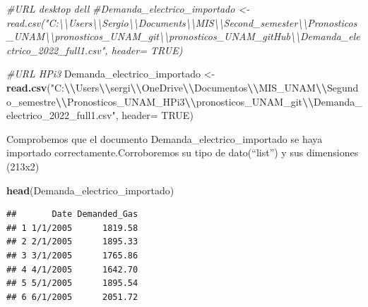 \documentclass[
]{article}
\newenvironment{Shaded}{\begin{snugshade}}{\end{snugshade}}
\newcommand{\AttributeTok}[1]{\textcolor[rgb]{0.13,0.29,0.53}{#1}}
\newcommand{\CommentTok}[1]{\textcolor[rgb]{0.56,0.35,0.01}{\textit{#1}}}
\newcommand{\ConstantTok}[1]{\textcolor[rgb]{0.56,0.35,0.01}{#1}}
\newcommand{\FunctionTok}[1]{\textcolor[rgb]{0.13,0.29,0.53}{\textbf{#1}}}
\newcommand{\NormalTok}[1]{#1}
\newcommand{\OtherTok}[1]{\textcolor[rgb]{0.56,0.35,0.01}{#1}}
\newcommand{\SpecialCharTok}[1]{\textcolor[rgb]{0.81,0.36,0.00}{\textbf{#1}}}
\newcommand{\StringTok}[1]{\textcolor[rgb]{0.31,0.60,0.02}{#1}}
\begin{document}
\begin{Shaded}
\begin{Highlighting}[]
\CommentTok{\#URL desktop dell}
\CommentTok{\#Demanda\_electrico\_importado \textless{}{-}read.csv("C:\textbackslash{}\textbackslash{}Users\textbackslash{}\textbackslash{}Sergio\textbackslash{}\textbackslash{}Documents\textbackslash{}\textbackslash{}MIS\textbackslash{}\textbackslash{}Second\_semester\textbackslash{}\textbackslash{}Pronosticos\_UNAM\textbackslash{}\textbackslash{}pronosticos\_UNAM\_git\textbackslash{}\textbackslash{}pronosticos\_UNAM\_gitHub\textbackslash{}\textbackslash{}Demanda\_electrico\_2022\_full1.csv", header= TRUE)}

\CommentTok{\#URL HPi3}
\NormalTok{Demanda\_electrico\_importado }\OtherTok{\textless{}{-}}\FunctionTok{read.csv}\NormalTok{(}\StringTok{"C:}\SpecialCharTok{\textbackslash{}\textbackslash{}}\StringTok{Users}\SpecialCharTok{\textbackslash{}\textbackslash{}}\StringTok{sergi}\SpecialCharTok{\textbackslash{}\textbackslash{}}\StringTok{OneDrive}\SpecialCharTok{\textbackslash{}\textbackslash{}}\StringTok{Documentos}\SpecialCharTok{\textbackslash{}\textbackslash{}}\StringTok{MIS\_UNAM}\SpecialCharTok{\textbackslash{}\textbackslash{}}\StringTok{Segundo\_semestre}\SpecialCharTok{\textbackslash{}\textbackslash{}}\StringTok{Pronosticos\_UNAM\_HPi3}\SpecialCharTok{\textbackslash{}\textbackslash{}}\StringTok{pronosticos\_UNAM\_git}\SpecialCharTok{\textbackslash{}\textbackslash{}}\StringTok{Demanda\_electrico\_2022\_full1.csv"}\NormalTok{, }\AttributeTok{header=} \ConstantTok{TRUE}\NormalTok{)}
\end{Highlighting}
\end{Shaded}

Comprobemos que el documento Demanda\_electrico\_importado se haya
importado correctamente.Corroboremos su tipo de dato(``list'') y sus
dimensiones (213x2)

\begin{Shaded}
\begin{Highlighting}[]
\FunctionTok{head}\NormalTok{(Demanda\_electrico\_importado)}
\end{Highlighting}
\end{Shaded}

\begin{verbatim}
##       Date Demanded_Gas
## 1 1/1/2005      1819.58
## 2 2/1/2005      1895.33
## 3 3/1/2005      1765.86
## 4 4/1/2005      1642.70
## 5 5/1/2005      1895.54
## 6 6/1/2005      2051.72
\end{verbatim}
\end{document}
